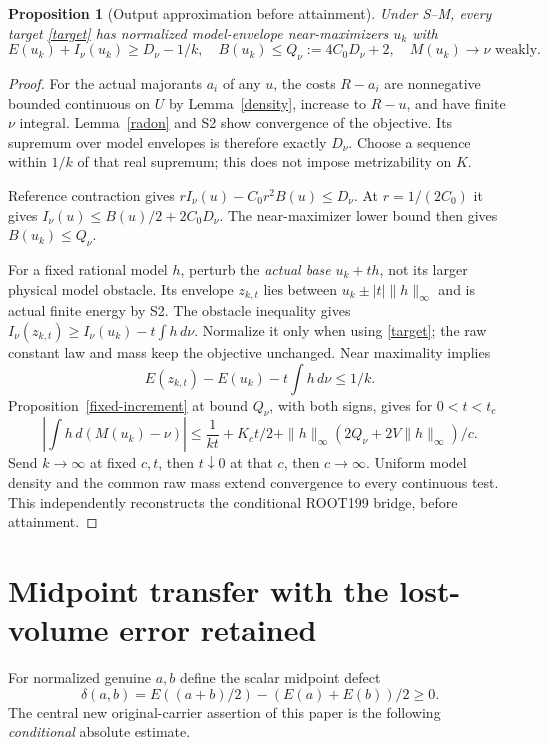 \documentclass[10pt]{article}
\newtheorem{proposition}[theorem]{Proposition}
\begin{document}
\begin{proposition}[Output approximation before attainment]\label{output-approx}
Under S--M, every target \eqref{target} has normalized model-envelope
near-maximizers $u_k$ with
\[
 E(u_k)+I_\nu(u_k)\geq D_\nu-1/k,\quad
 B(u_k)\leq Q_\nu:=4C_0D_\nu+2,\quad M(u_k)\to\nu\text{ weakly}.
\]
\end{proposition}
\begin{proof}
For the actual majorants $a_i$ of any $u$, the costs $R-a_i$ are
nonnegative bounded continuous on $U$ by Lemma~\ref{density}, increase
to $R-u$, and have finite $\nu$ integral. Lemma~\ref{radon} and S2
show convergence of the objective. Its supremum over model envelopes
is therefore exactly $D_\nu$. Choose a sequence within $1/k$ of that
real supremum; this does not impose metrizability on $K$.

Reference contraction gives
$rI_\nu(u)-C_0r^2B(u)\leq D_\nu$. At $r=1/(2C_0)$ it gives
$I_\nu(u)\leq B(u)/2+2C_0D_\nu$. The near-maximizer lower bound
then gives $B(u_k)\leq Q_\nu$.

For a fixed rational model $h$, perturb the \emph{actual base}
$u_k+th$, not its larger physical model obstacle. Its envelope $z_{k,t}$
lies between $u_k\pm|t|\|h\|_\infty$ and is actual finite energy by S2.
The obstacle inequality gives
$I_\nu(z_{k,t})\geq I_\nu(u_k)-t\int h\,d\nu$.
Normalize it only when using \eqref{target}; the raw constant law and
mass keep the objective unchanged. Near maximality implies
\[
 E(z_{k,t})-E(u_k)-t\int h\,d\nu\leq1/k.
\]
Proposition~\ref{fixed-increment} at bound $Q_\nu$, with both signs,
gives for $0<t<t_c$
\[
 \left|\int h\,d(M(u_k)-\nu)\right|
 \leq \frac1{kt}+K_ct/2+
           \|h\|_\infty(2Q_\nu+2V\|h\|_\infty)/c.
\]
Send $k\to\infty$ at fixed $c,t$, then $t\downarrow0$ at that $c$,
then $c\to\infty$. Uniform model density and the common raw mass
extend convergence to every continuous test. This independently
reconstructs the conditional ROOT199 bridge, before attainment.
\end{proof}

\section{Midpoint transfer with the lost-volume error retained}\label{transfer}
For normalized genuine $a,b$ define the scalar midpoint defect
\[
 \delta(a,b)=E((a+b)/2)-(E(a)+E(b))/2\geq0.
\]
The central new original-carrier assertion of this paper is the following
\emph{conditional} absolute estimate.
\end{document}
